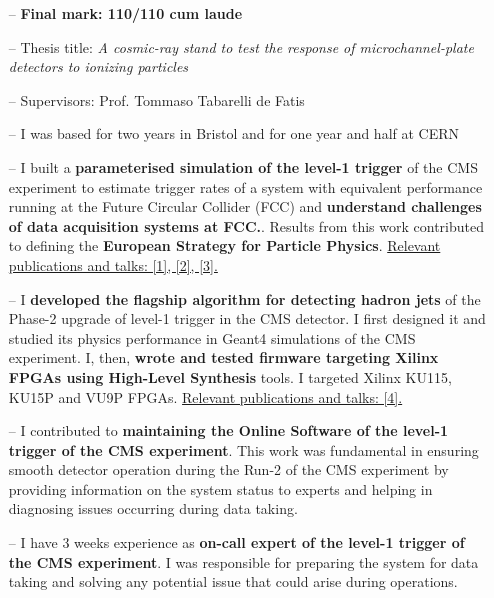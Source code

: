 \documentclass[10pt,a4paper]{altacv}
\begin{document}
\begin{itemize}
    \setlength{\itemindent}{0.5em}
    \item[--]   \small{\textbf{Final mark: 110/110 cum laude}}
    \item[--]   \small{Thesis title: \textit{A cosmic-ray stand to test the response of
microchannel-plate detectors to ionizing particles}}
    \item[--]   \small{Supervisors: Prof. Tommaso Tabarelli de Fatis} 
\end{itemize}




\begin{itemize}
    \setlength{\itemindent}{0.5em}
    \item[--]   \small{I was based for two years in Bristol and for one year and half at CERN}
    \item[--]   \small{I built a \textbf{parameterised simulation of the level-1 trigger} of the CMS experiment to estimate trigger rates of a system with equivalent performance running at the Future Circular Collider (FCC) and \textbf{understand challenges of data acquisition systems at FCC.}}. Results from this work contributed to defining the \textbf{European Strategy for Particle Physics}.
    \underline{Relevant publications and talks: [1], [2], [3].}
    \item[--]   \small{I \textbf{developed the flagship algorithm for detecting hadron jets} of the Phase-2 upgrade of level-1 trigger in the CMS detector. I first designed it and studied its physics performance in Geant4 simulations of the CMS experiment. I, then, \textbf{wrote and tested firmware targeting Xilinx FPGAs using High-Level Synthesis} tools. I targeted Xilinx KU115, KU15P and VU9P FPGAs.}
    \underline{Relevant publications and talks: [4].}
    \item[--] I contributed to \textbf{maintaining the Online Software of the level-1 trigger of the CMS experiment}. This work was fundamental in ensuring smooth detector operation during the Run-2 of the CMS experiment by providing information on the system status to experts and helping in diagnosing issues occurring during data taking.
    \item[--] I have 3 weeks experience as \textbf{on-call expert of the level-1 trigger of the CMS experiment}. I was responsible for preparing the system for data taking and solving any potential issue that could arise during operations.
\end{itemize}
\end{document}
